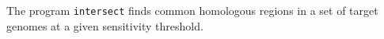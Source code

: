 The program \texttt{intersect} finds common homologous regions in a
set of target genomes at a given sensitivity threshold.

